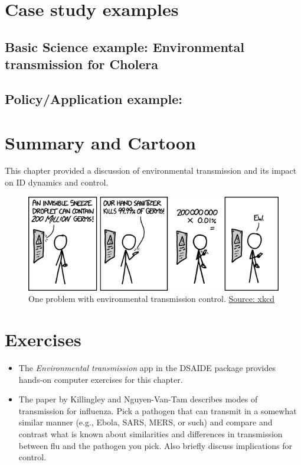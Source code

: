 \documentclass[]{book}
\providecommand{\tightlist}{%
  \setlength{\itemsep}{0pt}\setlength{\parskip}{0pt}}
\theoremstyle{definition}
\theoremstyle{definition}
\theoremstyle{definition}
\theoremstyle{remark}
\begin{document}
\section{Case study examples}\label{case-study-examples-1}

\subsection{Basic Science example: Environmental transmission for
Cholera}\label{basic-science-example-environmental-transmission-for-cholera}

\subsection{Policy/Application
example:}\label{policyapplication-example}

\section{Summary and Cartoon}\label{summary-and-cartoon-6}

This chapter provided a discussion of environmental transmission and its
impact on ID dynamics and control.

\begin{figure}
\centering
\includegraphics{./images/xkcd-hand_sanitizer.png}
\caption{One problem with environmental transmission control.
\href{https://xkcd.com/1161/}{Source: xkcd}}
\end{figure}

\section{Exercises}\label{exercises-6}

\begin{itemize}
\tightlist
\item
  The \emph{Environmental transmission} app in the DSAIDE package
  provides hands-on computer exercises for this chapter.
\item
  The paper by Killingley and Nguyen-Van-Tam describes modes of
  transmission for influenza. Pick a pathogen that can transmit in a
  somewhat similar manner (e.g., Ebola, SARS, MERS, or such) and compare
  and contrast what is known about similarities and differences in
  transmission between flu and the pathogen you pick. Also briefly
  discuss implications for control.
\end{itemize}
\end{document}
